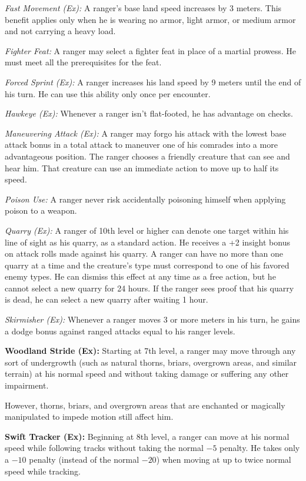 \textit{Fast Movement (Ex):} A ranger's base land speed increases by 3 meters. This benefit applies only when he is wearing no armor, light armor, or medium armor and not carrying a heavy load.

\textit{Fighter Feat:} A ranger may select a fighter feat in place of a martial prowess. He must meet all the prerequisites for the feat.

\textit{Forced Sprint (Ex):} A ranger increases his land speed by 9 meters until the end of his turn. He can use this ability only once per encounter.

\textit{Hawkeye (Ex):} Whenever a ranger isn't flat-footed, he has advantage on  checks.

\textit{Maneuvering Attack (Ex):} A ranger may forgo his attack with the lowest base attack bonus in a total attack to maneuver one of his comrades into a more advantageous position. The ranger chooses a friendly creature that can see and hear him. That creature can use an immediate action to move up to half its speed.

\textit{Poison Use:} A ranger never risk accidentally poisoning himself when applying poison to a weapon.

\textit{Quarry (Ex):} A ranger of 10th level or higher can denote one target within his line of sight as his quarry, as a standard action. He receives a +2 insight bonus on attack rolls made against his quarry. A ranger can have no more than one quarry at a time and the creature's type must correspond to one of his favored enemy types. He can dismiss this effect at any time as a free action, but he cannot select a new quarry for 24 hours. If the ranger sees proof that his quarry is dead, he can select a new quarry after waiting 1 hour.

\textit{Skirmisher (Ex):} Whenever a ranger moves 3 or more meters in his turn, he gains a dodge bonus against ranged attacks equal to \onequarter his ranger levels.


\textbf{Woodland Stride (Ex):} Starting at 7th level, a ranger may move through any sort of undergrowth (such as natural thorns, briars, overgrown areas, and similar terrain) at his normal speed and without taking damage or suffering any other impairment.

However, thorns, briars, and overgrown areas that are enchanted or magically manipulated to impede motion still affect him.


\textbf{Swift Tracker (Ex):} Beginning at 8th level, a ranger can move at his normal speed while following tracks without taking the normal $-5$ penalty. He takes only a $-10$ penalty (instead of the normal $-20$) when moving at up to twice normal speed while tracking.



